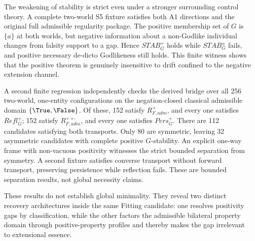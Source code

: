 The weakening of stability is strict even under a stronger surrounding control theory. A complete two-world S5 fixture satisfies both A1 directions and the original full admissible regularity package. The positive membership set of \(G\) is \(\{a\}\) at both worlds, but negative information about a non-Godlike individual changes from falsity support to a gap. Hence \(STAB_G^+\) holds while \(STAB_G^{\pm}\) fails, and positive necessary de-dicto Godlikeness still holds. This finite witness shows that the positive theorem is genuinely insensitive to drift confined to the negative extension channel.

A second finite regression independently checks the derived bridge over all 256 two-world, one-entity configurations on the negation-closed classical admissible domain \(\{\True,\False\}\). Of these, 152 satisfy \(R_{F,adm}^+\), and every one satisfies \(Refl_G^+\); 152 satisfy \(R_{F,adm}^{+\leftarrow}\), and every one satisfies \(Pers_G^+\). There are 112 candidates satisfying both transports. Only 80 are symmetric, leaving 32 asymmetric candidates with complete positive \(G\)-stability. An explicit one-way frame with non-vacuous positivity witnesses the strict bounded separation from symmetry. A second fixture satisfies converse transport without forward transport, preserving persistence while reflection fails. These are bounded separation results, not global necessity claims.

These results do not establish global minimality. They reveal two distinct recovery architectures inside the same Fitting candidate: one resolves positivity gaps by classification, while the other factors the admissible bilateral property domain through positive-property profiles and thereby makes the gap irrelevant to extensional essence.

